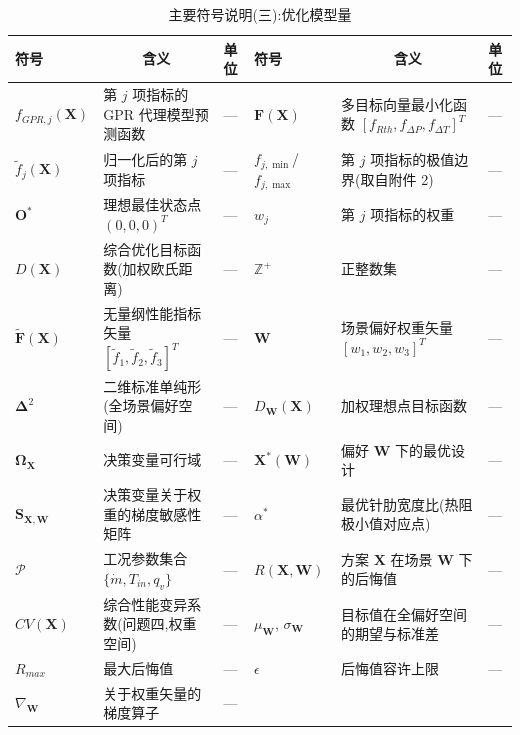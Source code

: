 \begin{table}[H]
\centering
\small
\setlength{\tabcolsep}{2.5pt}
\caption{主要符号说明(三):优化模型量}
\begin{tabular}{>{\centering\arraybackslash}p{1.4cm}p{4.6cm}>{\centering\arraybackslash}p{1.2cm}>{\centering\arraybackslash}p{1.4cm}p{4.6cm}>{\centering\arraybackslash}p{1.2cm}}
\toprule
符号 & \multicolumn{1}{c}{含义} & 单位 & 符号 & \multicolumn{1}{c}{含义} & 单位 \\
\midrule
$f_{GPR,j}(\mathbf{X})$ & 第 $j$ 项指标的 GPR 代理模型预测函数 & — & $\mathbf{F}(\mathbf{X})$ & 多目标向量最小化函数 $[f_{Rth}, f_{\Delta P}, f_{\Delta T}]^T$ & — \\
$\tilde{f}_j(\mathbf{X})$ & 归一化后的第 $j$ 项指标 & — & $f_{j,\min}$/$f_{j,\max}$ & 第 $j$ 项指标的极值边界(取自附件 2) & — \\
$\mathbf{O}^*$  & 理想最佳状态点 $(0,0,0)^T$ & — & $w_j$           & 第 $j$ 项指标的权重 & — \\
$D(\mathbf{X})$ & 综合优化目标函数(加权欧氏距离) & — & $\mathbb{Z}^+$  & 正整数集 & — \\
$\mathbf{\tilde{F}}(\mathbf{X})$ & 无量纲性能指标矢量 $[\tilde{f}_1, \tilde{f}_2, \tilde{f}_3]^T$ & — & $\mathbf{W}$    & 场景偏好权重矢量 $[w_1, w_2, w_3]^T$ & — \\
$\boldsymbol{\Delta}^2$ & 二维标准单纯形(全场景偏好空间) & — & $D_{\mathbf{W}}(\mathbf{X})$ & 加权理想点目标函数 & — \\
$\boldsymbol{\Omega}_{\mathbf{X}}$ & 决策变量可行域 & — & $\mathbf{X}^*(\mathbf{W})$ & 偏好 $\mathbf{W}$ 下的最优设计 & — \\
$\mathbf{S}_{\mathbf{X},\mathbf{W}}$ & 决策变量关于权重的梯度敏感性矩阵 & — & $\alpha^*$      & 最优针肋宽度比(热阻极小值对应点) & — \\
$\mathcal{P}$   & 工况参数集合 $\{\dot{m}, T_{in}, q_v\}$ & — & $R(\mathbf{X}, \mathbf{W})$ & 方案 $\mathbf{X}$ 在场景 $\mathbf{W}$ 下的后悔值 & — \\
$CV(\mathbf{X})$ & 综合性能变异系数(问题四,权重空间) & — & $\mu_{\mathbf{W}}$, $\sigma_{\mathbf{W}}$ & 目标值在全偏好空间的期望与标准差 & — \\
$R_{max}$       & 最大后悔值 & — & $\epsilon$      & 后悔值容许上限 & — \\
$\nabla_{\mathbf{W}}$ & 关于权重矢量的梯度算子 & — & \multicolumn{3}{l}{} \\
\bottomrule
\end{tabular}
\end{table}


